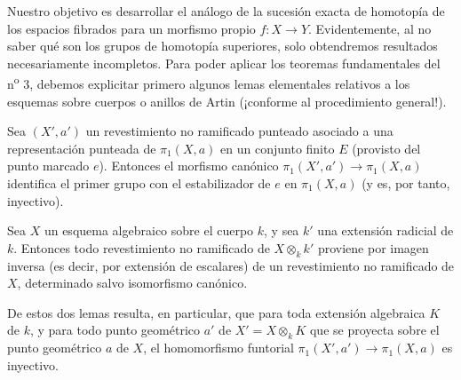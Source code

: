 Nuestro objetivo es desarrollar el análogo de la sucesión exacta de homotopía
de los espacios fibrados para un morfismo propio $f:X\longrightarrow Y$.
Evidentemente, al no saber qué son los grupos de homotopía superiores, solo
obtendremos resultados necesariamente incompletos. Para poder aplicar los
teoremas fundamentales del n\textsuperscript{o} 3, debemos explicitar primero
algunos lemas elementales relativos a los esquemas sobre cuerpos o anillos de
Artin (¡conforme al procedimiento general!).

 Sea $(X',a')$ un revestimiento no ramificado punteado asociado
a una representación punteada de $\pi_1(X,a)$ en un conjunto finito $E$
(provisto del punto marcado $e$). Entonces el morfismo canónico
$\pi_1(X',a')\longrightarrow\pi_1(X,a)$ identifica el primer grupo con el
estabilizador de $e$ en $\pi_1(X,a)$ (y es, por tanto, inyectivo).

 Sea $X$ un esquema algebraico sobre el cuerpo $k$, y sea $k'$
una extensión radicial de $k$. Entonces todo revestimiento no ramificado de
$X\otimes_k k'$ proviene por imagen inversa (es decir, por extensión de
escalares) de un revestimiento no ramificado de $X$, determinado salvo
isomorfismo canónico.

De estos dos lemas resulta, en particular, que para toda extensión algebraica
$K$ de $k$, y para todo punto geométrico $a'$ de $X'=X\otimes_k K$ que se
proyecta sobre el punto geométrico $a$ de $X$, el homomorfismo funtorial
$\pi_1(X',a')\longrightarrow\pi_1(X,a)$ es inyectivo.

